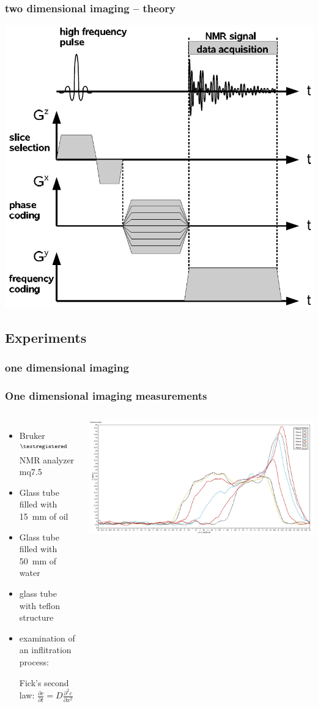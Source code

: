 \documentclass[aspectratio=169]{beamer}
\begin{document}
\begin{frame}
\frametitle{two dimensional imaging -- theory}
\begin{center}
\includegraphics[width=0.4\linewidth]{./Resources/2d_imaging.png}
\end{center}

\end{frame}

\subsection{Experiments}

\subsubsection{one dimensional imaging}

\begin{frame}
\frametitle{One dimensional imaging measurements}
\begin{columns}
\begin{itemize}
\item Bruker$^{\textregistered}$ NMR analyzer mq7.5
\item Glass tube filled with \SI{15}{mm} of oil
\item Glass tube filled with \SI{50}{mm} of water
\item glass tube with teflon structure
\item examination of an inflitration process: 

Fick's second law: $\frac{\partial c}{\partial t} = D \frac{\partial^2 c}{\partial x^2}$
\end{itemize}

\includegraphics[width=1.0 \linewidth]{./Resources/Teil_3/oeldiff_chinchilla.jpg}
\end{columns}	
\end{frame}
\end{document}
